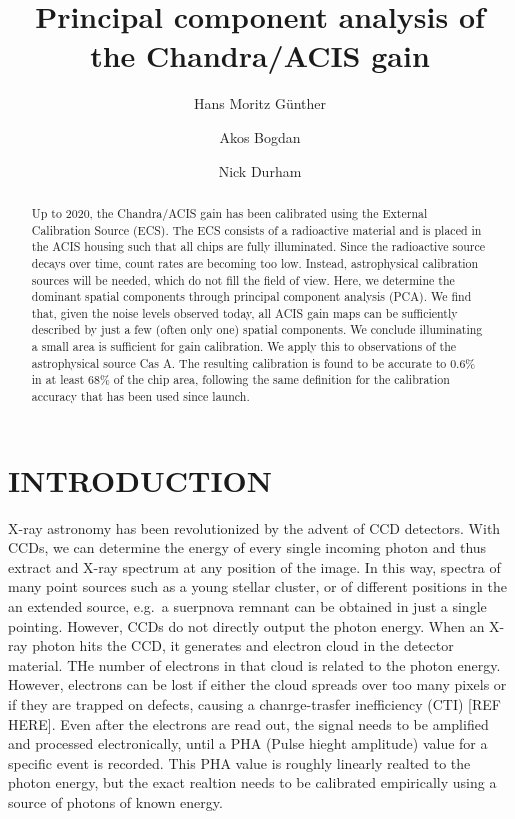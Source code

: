 \documentclass[]{spie}  %
\title{Principal component analysis of the Chandra/ACIS gain}
\author[a]{Hans Moritz G\"unther}
\author[b]{Akos Bogdan}
\author[b]{Nick Durham }
\affil[a]{MIT Kavli Institute for Astrophysics and Space Research, Massachusetts Institute of Technology, Cambridge, MA 02139, USA}
\affil[b]{Smithsonian Astrophysical Observatory, Cambridge, MA 02139, USA}
\begin{document}
\maketitle

\begin{abstract}
Up to 2020, the Chandra/ACIS gain has been calibrated using the External Calibration Source (ECS). The ECS consists of a radioactive material and is placed in the ACIS housing such that all chips are fully illuminated. Since the radioactive source decays over time, count rates are becoming too low. Instead, astrophysical calibration sources will be needed, which do not fill the field of view. Here, we determine the dominant spatial components through principal component analysis (PCA). We find that, given the noise levels observed today, all ACIS gain maps can be sufficiently described by just a few (often only one) spatial components. We conclude illuminating a small area is sufficient for gain calibration. We apply this to observations of the astrophysical source Cas A. The resulting calibration is found to be accurate to 0.6\% in at least 68\% of the chip area, following the same definition for the calibration accuracy that has been used since launch.
\end{abstract}



\section{INTRODUCTION}
\label{sec:intro}
X-ray astronomy has been revolutionized by the advent of CCD detectors. With CCDs, we can determine the energy of every single incoming photon and thus extract and X-ray spectrum at any position of the image. In this way, spectra of many point sources such as a young stellar cluster, or of different positions in the an extended source, e.g.\ a suerpnova remnant can be obtained in just a single pointing. However, CCDs do not directly output the photon energy. When an X-ray photon hits the CCD, it generates and electron cloud in the detector material. THe number of electrons in that cloud is related to the photon energy. However, electrons can be lost if either the cloud spreads over too many pixels or if they are trapped on defects, causing a chanrge-trasfer inefficiency (CTI) [REF HERE]. Even after the electrons are read out, the signal needs to be amplified and processed electronically, until a PHA (Pulse hieght amplitude) value for a specific event is recorded. This PHA value is roughly linearly realted to the photon energy, but the exact realtion needs to be calibrated empirically using a source of photons of known energy.
\end{document}
